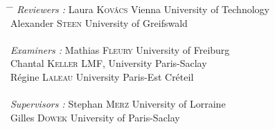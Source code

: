 \begin{titlepage}
\begin{addmargin}[-1cm]{-3cm}
        \begin{center}
        \vspace{1.5em}
        \begin{tabbing}
        \hspace{3cm} \= \hspace{5cm} \= \kill
        \textit{Reviewers :} \> Laura \textsc{Kovács} \> Vienna University of Technology \\
        \> Alexander \textsc{Steen} \> University of Greifswald \\
        \\
        \textit{Examiners :} \> Mathias \textsc{Fleury} \> University of Freiburg \\
        \> Chantal \textsc{Keller} \> LMF, University Paris-Saclay \\
        \> Régine \textsc{Laleau} \> University Paris-Est Créteil \\
        \\
        \textit{Supervisors :} \> Stephan \textsc{Merz} \> University of Lorraine \\
        \> Gilles \textsc{Dowek} \> University of Paris-Saclay \\
        \end{tabbing}
        \end{center}
  \end{addmargin}
\end{titlepage}   